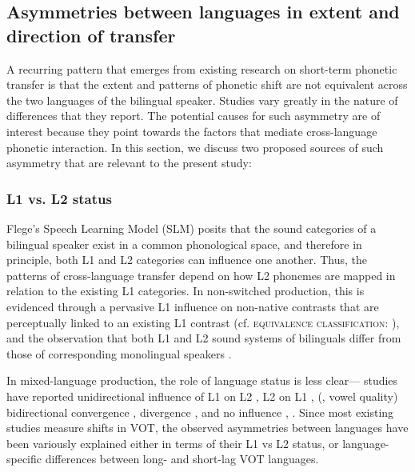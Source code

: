 \documentclass[12 pt]{article}
\begin{document}
\subsection{Asymmetries between languages in extent and direction of transfer} \label{asymmetries}
A recurring pattern that emerges from existing research on short-term phonetic transfer is that the extent and patterns of phonetic shift are not equivalent across the two languages of the bilingual speaker. Studies vary greatly in the nature of differences that they report. The potential causes for such asymmetry are of interest because they point towards the factors that mediate cross-language phonetic interaction. In this section, we discuss two proposed sources of such asymmetry that are relevant to the present study: 

\subsubsection*{L1 vs. L2 status} 
Flege's Speech Learning Model (SLM) \citeyearpar{flege1995second,flege2007language} posits that the sound categories of a bilingual speaker exist in a common phonological space, and therefore in principle, both L1 and L2 categories can influence one another. Thus, the patterns of cross-language transfer depend on how L2 phonemes are mapped in relation to the existing L1 categories. In non-switched production, this is evidenced through a pervasive L1 influence on non-native contrasts that are perceptually linked to an existing L1 contrast (cf. \textsc{equivalence classification}: \cite{flege1984limits,flege1987production}), and the observation that both L1 and L2 sound systems of bilinguals differ from those of corresponding monolingual speakers \citep[e.g.][vowel quality]{guion2003vowel}. 

In mixed-language production, the role of language status is less clear--- studies have reported unidirectional influence of L1 on L2 \citep[][VOT]{balukas2015spanish,antoniou2011inter,vsimavckova2015immediate,goldrick2014language}, L2 on L1 \citep[][VOT]{tsui2019impact, olson2013bilingual}, (\cite{elias2017effects}, vowel quality) bidirectional convergence \citep[][VOT]{bullock2009trying, olson2016role}, divergence \citep[][VOT]{bullock2009trying,vsimavckova2018patterns}, and no influence \citep[][vowel quality]{muldner2019phonetics}, \citep[][phonological process]{schwartz2015language}. Since most existing studies measure shifts in VOT, the observed asymmetries between languages have been variously explained either in terms of their L1 vs L2 status, or language-specific differences between long- and short-lag VOT languages. %
\end{document}
